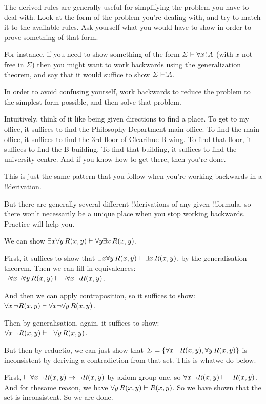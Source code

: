 \documentclass[../../include/open-logic-section]{subfiles}
\begin{document}

\begin{explain}

    The derived rules are generally useful for simplifying the problem
    you have to deal with. Look at the form of the problem you're dealing
with, and try to match it to the available rules. Ask yourself what you
would have to show in order to prove something of that form.

    For instance, if you need to show something of the form $\Sigma
\Proves \lforall[x][!A]$ (with $x$ not free in $\Sigma$) then you might
want to work backwards using the generalization theorem, and say that
    it would suffice to show $\Sigma \Proves !A$.

    In order to avoid confusing yourself, work backwards to reduce the
    problem to the simplest form possible, and then solve that problem.

    Intuitively, think of it like being given directions to find a place.
To get to my office, it suffices to find the Philosophy Department main
office. To find the main office, it suffices to find the 3rd floor of
    Clearihue B wing. To find that floor, it suffices to find the B
    building. To find that building, it suffices to find the university
    centre. And if you know how to get there, then you're done.

    This is just the same pattern that you follow when you're working
    backwards in a !!{derivation}.

    But there are generally several different !!{derivation}s of any given
    !!{formula}, so there won't necessarily be a unique place when you stop
    working backwards. Practice will help you.
\end{explain}

\begin{ex}
We can show $\lexists[x]\lforall[y][R(x,y)] \Proves
\lforall[y]\lexists[x][R(x,y)]$.

First, it suffices to show that $\lexists[x]\lforall[y][R(x,y)] \Proves
\lexists[x][R(x,y)]$, by the generalisation theorem. Then we can fill
    in equivalences:\\
$\lnot \lforall[x] \lnot \lforall[y][R(x,y)] \Proves \lnot
\lforall[x][\lnot R(x,y)]$.

And then we can apply contraposition, so it suffices to show:\\ 
$\lforall[x][\lnot R(x,y)] \Proves \lforall[x]\lnot \lforall[y][R(x,y)]$. 

Then by generalisation, again, it suffices to show:\\
$\lforall[x][\lnot R(x,y)] \Proves \lnot \lforall[y][R(x,y)]$. 

But then by reductio, we can just show that $\Sigma = \{\lforall[x][\lnot
R(x,y)], \lforall[y][R(x,y)]
\}$ is inconsistent by deriving a contradiction from that set. This is
whatwe do below.

First, $\Proves \lforall[x][\lnot R(x,y)] \rightarrow \lnot R(x,y)$ by
axiom
group one, so $\lforall[x][\lnot R(x,y)] \Proves \lnot R(x,y)$. And for thesame
reason, we have $\lforall[y][ R(x,y)] \Proves R(x,y)$. So we have shown
that the
set is inconsistent. So we are done.
\end{ex}
\end{document}
